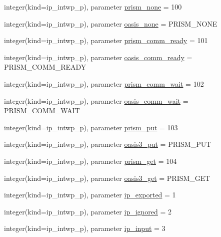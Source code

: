 \begin{DoxyCompactItemize}
\item 
integer(kind=ip\+\_\+intwp\+\_\+p), parameter \hyperlink{namespacemod__oasis__parameters_a81e4e20be511cd8be2ab3881b42f8f3e}{prism\+\_\+none} = 100
\item 
integer(kind=ip\+\_\+intwp\+\_\+p), parameter \hyperlink{namespacemod__oasis__parameters_a368402af56fd08ed95ad88d0c987733a}{oasis\+\_\+none} = P\+R\+I\+S\+M\+\_\+\+N\+O\+NE
\item 
integer(kind=ip\+\_\+intwp\+\_\+p), parameter \hyperlink{namespacemod__oasis__parameters_a953f0a4738f9ca919cf5e446998cc79e}{prism\+\_\+comm\+\_\+ready} = 101
\item 
integer(kind=ip\+\_\+intwp\+\_\+p), parameter \hyperlink{namespacemod__oasis__parameters_a8484e196ef7469adbeaef850787d7502}{oasis\+\_\+comm\+\_\+ready} = P\+R\+I\+S\+M\+\_\+\+C\+O\+M\+M\+\_\+\+R\+E\+A\+DY
\item 
integer(kind=ip\+\_\+intwp\+\_\+p), parameter \hyperlink{namespacemod__oasis__parameters_a3d0349d8815bf1848122d99993097842}{prism\+\_\+comm\+\_\+wait} = 102
\item 
integer(kind=ip\+\_\+intwp\+\_\+p), parameter \hyperlink{namespacemod__oasis__parameters_a9df795bd9123857642aae31661b6c13a}{oasis\+\_\+comm\+\_\+wait} = P\+R\+I\+S\+M\+\_\+\+C\+O\+M\+M\+\_\+\+W\+A\+IT
\item 
integer(kind=ip\+\_\+intwp\+\_\+p), parameter \hyperlink{namespacemod__oasis__parameters_ad8db79b2d411e8f04445dcc2ed619548}{prism\+\_\+put} = 103
\item 
integer(kind=ip\+\_\+intwp\+\_\+p), parameter \hyperlink{namespacemod__oasis__parameters_a325334a5e2f9d0c7846c1ef964f9f7e3}{oasis3\+\_\+put} = P\+R\+I\+S\+M\+\_\+\+P\+UT
\item 
integer(kind=ip\+\_\+intwp\+\_\+p), parameter \hyperlink{namespacemod__oasis__parameters_a136a476f2771e33d12e42b47eef72f9b}{prism\+\_\+get} = 104
\item 
integer(kind=ip\+\_\+intwp\+\_\+p), parameter \hyperlink{namespacemod__oasis__parameters_aa2ac99363b8f1aa7ff950fda3e3f5fff}{oasis3\+\_\+get} = P\+R\+I\+S\+M\+\_\+\+G\+ET
\item 
integer(kind=ip\+\_\+intwp\+\_\+p), parameter \hyperlink{namespacemod__oasis__parameters_a0f729cda95773cdc8df800eacdceb606}{ip\+\_\+exported} = 1
\item 
integer(kind=ip\+\_\+intwp\+\_\+p), parameter \hyperlink{namespacemod__oasis__parameters_ae3733a399c07b165b5ad19543ca1d2a2}{ip\+\_\+ignored} = 2
\item 
integer(kind=ip\+\_\+intwp\+\_\+p), parameter \hyperlink{namespacemod__oasis__parameters_a6a7bcd0e3a33573729f94098ecd9a922}{ip\+\_\+input} = 3

\end{DoxyCompactItemize}
